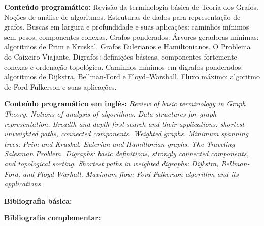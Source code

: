 \documentclass[class=article, crop=false]{standalone}
\begin{document}
\textbf{Conteúdo programático:}
Revisão da terminologia básica de Teoria dos Grafos.
Noções de análise de algoritmos.
Estruturas de dados para representação de grafos.
Buscas em largura e profundidade e suas aplicações: caminhos mínimos sem pesos, componentes conexas.
Grafos ponderados. 
Árvores geradoras mínimas: algoritmos de Prim e Kruskal.
Grafos Eulerianos e Hamiltonianos.
O Problema do Caixeiro Viajante.
Digrafos: definições básicas, componentes fortemente conexas e ordenação topológica.
Caminhos mínimos em digrafos ponderados: algoritmos de Dijkstra, Bellman-Ford e Floyd–Warshall.
Fluxo máximo: algoritmo de Ford-Fulkerson e suas aplicações.

\textbf{Conteúdo programático em inglês:}
\textit{Review of basic terminology in Graph Theory.
Notions of analysis of algorithms.
Data structures for graph representation.
Breadth and depth first search and their applications: shortest unweighted paths, connected components.
Weighted graphs.
Minimum spanning trees: Prim and Kruskal.
Eulerian and Hamiltonian graphs.
The Traveling Salesman Problem.
Digraphs: basic definitions, strongly connected components, and topological sorting.
Shortest paths in weighted digraphs: Dijkstra, Bellman-Ford, and Floyd-Warhall.
Maximum flow: Ford-Fulkerson algorithm and its applications.}

\newrefsection
\textbf{Bibliografia básica:}
\nocite{2002-sedgewick, 2012-cormen-etal, 1995-tenenbaum-etal}
\printbibliography

\newrefsection
\textbf{Bibliografia complementar:}
\nocite{2011-sedgewick-wayne, 2002-cormen-etal, 1993-ahuja-etal, 2008-dasgupta-etal}
\printbibliography
\end{document}
